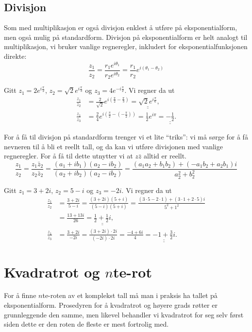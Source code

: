 \documentclass[a4paper,norsk,12pt]{article}
\newcommand{\ans}[1]{\underline{\underline{#1}}}
\newcounter{exa}
\begin{document}
\subsection{Divisjon}
Som med multiplikasjon er også divisjon enklest å utføre på eksponentialform, men også mulig på standardform. Divisjon på eksponentialform er helt analogt til multiplikasjon, vi bruker vanlige regneregler, inkludert for eksponentialfunksjonen direkte:
\begin{displaymath}
	\frac{z_1}{z_2} = \frac{r_1e^{i\theta_1}}{r_2e^{i\theta_2}} = \frac{r_1}{r_2}e^{i(\theta_1-\theta_2)}
\end{displaymath}
\begin{texample}
Gitt $z_1 = 2e^{ i\frac{\pi}{2}}$, $z_2 = \sqrt{2}e^{i\frac{\pi}{3}}$ og $z_3 = 4e^{-i\frac{\pi}{2}}$. Vi regner da ut
\begin{align*}
	\frac{z_1}{z_2} &= \frac{2}{\sqrt{2}}e^{i\left(\frac{\pi}{2}-\frac{\pi}{3}\right)} = \ans{\sqrt{2}e^{i\frac{\pi}{6}}}, \\
	\frac{z_1}{z_3} &= \frac{2}{4}e^{i\left(\frac{\pi}{2}-\left(-\frac{\pi}{2}\right)\right)} = \frac12e^{i\pi} = \ans{-\frac12}.
\end{align*}
\end{texample}
For å få til divisjon på standardform trenger vi et lite ``triks'': vi må sørge for å få nevneren til å bli et reellt tall, og da kan vi utføre divisjonen med vanlige regneregler. For å få til dette utnytter vi at $z\bar{z}$ alltid er reellt.
\begin{displaymath}
	\frac{z_1}{z_2} = \frac{z_1\bar{z}_2}{z_2\bar{z}_2} = \frac{(a_1+ib_1)(a_2-ib_2)}{(a_2+ib_2)(a_2-ib_2)} = \frac{(a_1a_2+b_1b_2)+(-a_1b_2+a_2b_1)i}{a_2^2+b_2^2}
\end{displaymath}
\begin{texample}
Gitt $z_1 = 3+2i$, $z_2 = 5-i$ og $z_3 = -2i$. Vi regner da ut
\begin{align*}
	\frac{z_1}{z_2} &= \frac{3+2i}{5-i} = \frac{(3+2i)(5+i)}{(5-i)(5+i)} = \frac{(3\cdot5-2\cdot1) + (3\cdot1+2\cdot5)i}{5^2+1^2} \\
	&= \frac{13 + 13i}{26} = \ans{\frac12 + \frac12 i}, \\[12pt]
	\frac{z_1}{z_3} &= \frac{3+2i}{-2i} = \frac{(3+2i)\cdot2i}{(-2i)\cdot 2i} = \frac{-4+6i}{4} = \ans{-1+\frac{3}{2}i}.
\end{align*}
\end{texample}

\section{Kvadratrot og $n$te-rot}
For å finne $n$te-roten av et komplekst tall må man i praksis ha tallet på eksponentialform. Prosedyren for å kvadratrot og høyere grads røtter er grunnleggende den samme, men likevel behandler vi kvadratrot for seg selv først siden dette er den roten de fleste er mest fortrolig med. 
\end{document}
